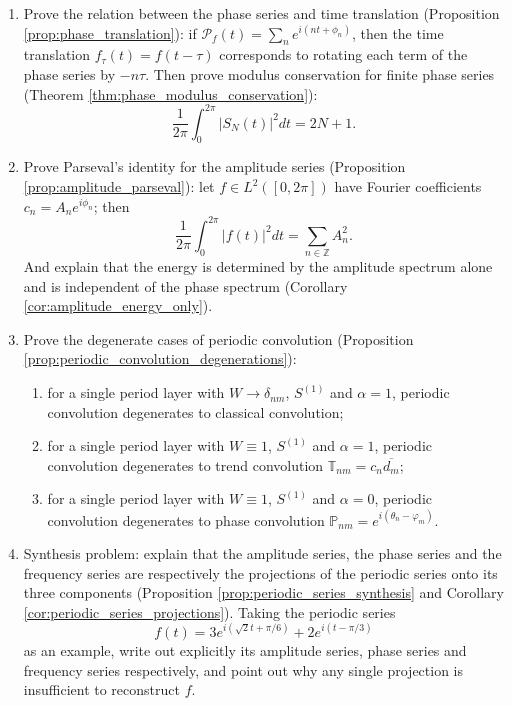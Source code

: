 \begin{enumerate}[leftmargin=3em, label=\textbf{Exercise \arabic*}]
    \item Prove the relation between the phase series and time translation (Proposition \ref{prop:phase_translation}):
    if $\mathcal{P}_f(t)=\sum_n e^{i(nt+\phi_n)}$,
    then the time translation $f_\tau(t)=f(t-\tau)$ corresponds to rotating each term of the phase series by $-n\tau$.
    Then prove modulus conservation for finite phase series (Theorem \ref{thm:phase_modulus_conservation}):
    \[
    \frac{1}{2\pi}\int_0^{2\pi}|S_N(t)|^2dt=2N+1.
    \]

    \item Prove Parseval's identity for the amplitude series (Proposition \ref{prop:amplitude_parseval}):
    let $f\in L^2([0,2\pi])$ have Fourier coefficients $c_n=A_ne^{i\phi_n}$; then
    \[
    \frac{1}{2\pi}\int_0^{2\pi}|f(t)|^2dt=\sum_{n\in\mathbb{Z}}A_n^2.
    \]
    And explain that the energy is determined by the amplitude spectrum alone and is independent of the phase spectrum (Corollary \ref{cor:amplitude_energy_only}).

    \item Prove the degenerate cases of periodic convolution (Proposition \ref{prop:periodic_convolution_degenerations}):
    \begin{enumerate}[label=(\roman*)]
        \item for a single period layer with $W\to\delta_{nm}$, $S^{(1)}$ and $\alpha=1$,
              periodic convolution degenerates to classical convolution;
        \item for a single period layer with $W\equiv1$, $S^{(1)}$ and $\alpha=1$,
              periodic convolution degenerates to trend convolution $\mathbb{T}_{nm}=c_n\overline{d_m}$;
        \item for a single period layer with $W\equiv1$, $S^{(1)}$ and $\alpha=0$,
              periodic convolution degenerates to phase convolution $\mathbb{P}_{nm}=e^{i(\theta_n-\varphi_m)}$.
    \end{enumerate}

    \item Synthesis problem: explain that the amplitude series, the phase series and the frequency series are respectively the projections of the periodic series onto its three components
    (Proposition \ref{prop:periodic_series_synthesis} and Corollary \ref{cor:periodic_series_projections}).
    Taking the periodic series
    \[
    f(t)=3e^{i(\sqrt{2}t+\pi/6)}+2e^{i(t-\pi/3)}
    \]
    as an example, write out explicitly its amplitude series, phase series and frequency series respectively,
    and point out why any single projection is insufficient to reconstruct $f$.
\end{enumerate}

